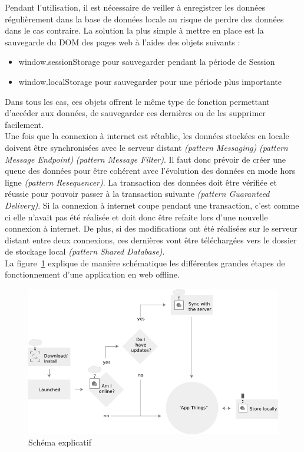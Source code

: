 	Pendant l’utilisation, il est nécessaire de veiller à enregistrer les données régulièrement dans la base de données locale au risque de perdre des données dans le cas contraire. La solution la plus simple à mettre en place est la sauvegarde du DOM des pages web à l’aides des objets suivants :

	\begin{itemize}
		\item window.sessionStorage pour sauvegarder pendant la période de Session
		\item window.localStorage pour sauvegarder pour une période plus importante
	\end{itemize}

	Dans tous les cas, ces objets offrent le même type de fonction permettant d'accéder aux données, de sauvegarder ces dernières ou de les supprimer facilement.\\

	Une fois que la connexion à internet est rétablie, les données stockées en locale doivent être synchronisées avec le serveur distant \textit{(pattern Messaging)} \textit{(pattern Message Endpoint)} \textit{(pattern Message Filter)}. Il faut donc prévoir de créer une queue des données pour être cohérent avec l’évolution des données en mode hors ligne \textit{(pattern Resequencer)}. La transaction des données doit être vérifiée et réussie pour pouvoir passer à la transaction suivante \textit{(pattern Guaranteed Delivery)}. Si la connexion à internet coupe pendant une transaction, c’est comme ci elle n’avait pas été réalisée et doit donc être refaite lors d’une nouvelle connexion à internet. De plus, si des modifications ont été réalisées sur le serveur distant entre deux connexions, ces dernières vont être téléchargées vers le dossier de stockage local \textit{(pattern Shared Database)}.\\

	La figure~\ref{schema} explique de manière schématique les différentes grandes étapes de fonctionnement d'une application en web offline.

	\begin{figure}[h!]
		\centering
	  	\includegraphics[width=18cm]{./images/schema.png}
	  	\caption{Schéma explicatif}
	  	\label{schema}
	\end{figure}

